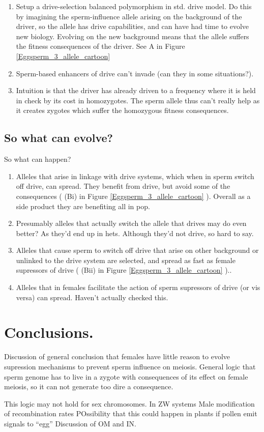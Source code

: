 \documentclass[12pt,letterpaper]{article}
\begin{document}
\begin{enumerate}
\item Setup a drive-selection balanced polymorphism in std. drive model. 
Do this by imagining the sperm-influence allele arising on the background of the driver, 
so the allele has drive capabilities, and can have had time to evolve new biology. 
Evolving on the new background means that the allele suffers the fitness consequences of the 
driver.  See A in Figure \ref{Eggsperm_3_allele_cartoon} \\
\item Sperm-based enhancers of drive can't invade (can they in some situations?). \\
\item Intuition is that the driver has already driven to a frequency 
where it is held in check by its cost in homozygotes. The sperm allele 
thus can't really help as it creates zygotes which suffer the homozygous fitness consequences.
\end{enumerate}

\subsection{So what can evolve?}
So what can happen?
\begin{enumerate}
\item Alleles that arise in linkage with drive systems, which when in sperm switch off drive, 
can spread. They benefit from drive, but avoid some of the
consequences ( (Bi) in Figure \ref{Eggsperm_3_allele_cartoon} ). Overall as a side product they are benefiting all in pop.\\
\item Presumably alleles that actually switch the allele that drives may do even better? As they'd end up in 
hets. Although they'd not drive, so hard to say.\\
\item Alleles that cause sperm to switch off drive that arise on other background or unlinked to the drive system
are selected, and spread as fast as female supressors of drive ( (Bii) in Figure \ref{Eggsperm_3_allele_cartoon} )..\\
\item Alleles that in females facilitate the action of sperm supressors of drive (or vis versa) can spread. Haven't actually checked this.\\
\end{enumerate}

\section*{Conclusions.}
Discussion of general conclusion that females have little reason to evolve supression mechanisms to prevent sperm influence on meiosis. 
General logic that sperm genome has to live in a zygote with consequences of its effect on female meiosis, so
it can not generate too dire a consequence.

This logic may not hold for sex chromosomes. In ZW systems 
 Male modification of recombination rates
POssibility that this could happen in plants if pollen emit signals to ``egg''
Discussion of OM and IN.
\end{document}
